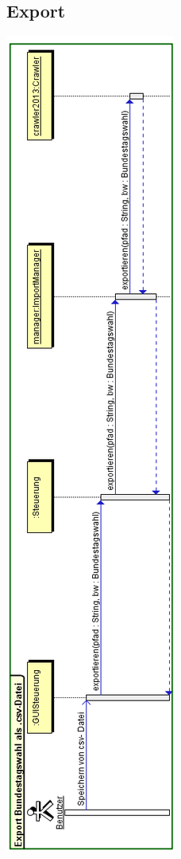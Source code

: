 \documentclass[12pt,a4paper,titlepage]{article}
\begin{document}
\subsection{Export}
\includegraphics[scale=0.75]{Export-Sequenzdiagramm.png} 
\end{document}
